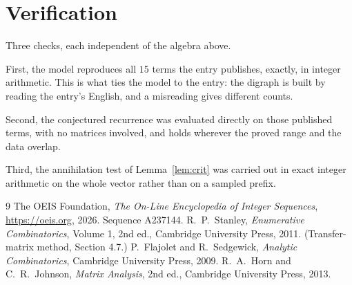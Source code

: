 \documentclass[11pt,a4paper]{article}
\theoremstyle{plain}
\theoremstyle{definition}
\begin{document}
\section{Verification}

Three checks, each independent of the algebra above.

First, the model reproduces all $15$ terms the entry publishes, exactly, in integer
arithmetic. This is what ties the model to the entry: the digraph is built by reading the
entry's English, and a misreading gives different counts.

Second, the conjectured recurrence was evaluated directly on those published terms, with no
matrices involved, and holds wherever the proved range and the data overlap.

Third, the annihilation test of Lemma~\ref{lem:crit} was carried out in exact integer
arithmetic on the whole vector rather than on a sampled prefix.

\begin{thebibliography}{9}
 The OEIS Foundation, \emph{The On-Line Encyclopedia of Integer
Sequences}, \url{https://oeis.org}, 2026. Sequence A237144.
 R.~P.~Stanley, \emph{Enumerative Combinatorics}, Volume 1, 2nd ed.,
Cambridge University Press, 2011. (Transfer-matrix method, Section 4.7.)
 P.~Flajolet and R.~Sedgewick, \emph{Analytic Combinatorics}, Cambridge
University Press, 2009.
 R.~A.~Horn and C.~R.~Johnson, \emph{Matrix Analysis}, 2nd ed., Cambridge
University Press, 2013.
\end{thebibliography}
\end{document}
